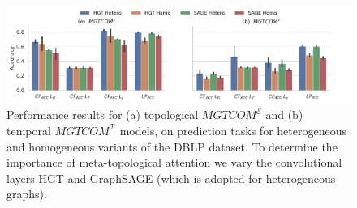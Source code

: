 \begin{figure}[ht]
\centering

\includegraphics[width=\columnwidth]{resources/figs/abl_meta.pdf}

\caption{
Performance results for (a) topological $MGTCOM^{\mathcal{E}}$ and (b) temporal $MGTCOM^{\mathcal{T}}$ models, on prediction tasks for heterogeneous and homogeneous variants of the DBLP dataset.
To determine the importance of meta-topological attention we vary the convolutional layers HGT and GraphSAGE (which is adopted for heterogeneous graphs).
}
\label{fig:ablation_meta}
\end{figure}